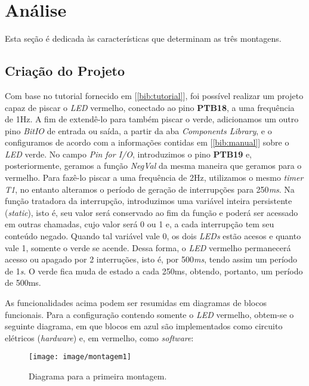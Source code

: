 \section {Análise}

Esta seção é dedicada às características que determinam as três montagens.

\subsection{Criação do Projeto}

Com base no tutorial fornecido em [\ref{bib:tutorial}], foi possível
realizar um projeto capaz de piscar o \textit{LED} vermelho, conectado ao pino
\textbf{PTB18}, a uma frequência de 1Hz. A fim de extendê-lo para também piscar
o verde, adicionamos um outro pino \textit {BitIO} de entrada ou saída, a partir
da aba \textit{Components Library}, e o configuramos de acordo com a informações
contidas em [\ref{bib:manual}] sobre o \textit{LED} verde. No campo \textit{Pin
for I/O}, introduzimos o pino \textbf{PTB19} e, posteriormente, geramos a função
\textit{NegVal} da mesma maneira que geramos para o vermelho. Para fazê-lo
piscar a uma frequência de 2Hz, utilizamos o mesmo \textit{timer} \textit{T1},
no entanto alteramos o período de geração de interrupções para 250\textit{ms}.
Na função tratadora da interrupção, introduzimos uma variável inteira
persistente (\textit{static}), isto é, seu valor será conservado ao fim da
função e poderá ser acessado em outras chamadas, cujo valor será 0 ou 1 e, a
cada interrupção tem seu conteúdo negado. Quando tal variável vale 0, os dois
\textit{LEDs} estão acesos e quanto vale 1, somente o verde se acende. Dessa
forma, o \textit{LED} vermelho permanecerá acesso ou apagado por 2 interruções,
isto é, por 500\textit{ms}, tendo assim um período de 1\textit{s}. O verde fica
muda de estado a cada 250ms, obtendo, portanto, um período de 500ms.

\vspace{12pt}

As funcionalidades acima podem ser resumidas em diagramas de blocos funcionais.
Para a configuração contendo somente o \textit{LED} vermelho, obtem-se o
seguinte diagrama, em que blocos em azul são implementados como circuito
elétricos (\textit{hardware}) e, em vermelho, como \textit{software}: 

\FloatBarrier

\begin{figure}[h]
    \centering
    \texttt{[image: image/montagem1]}
    
    \caption{Diagrama para a primeira montagem.}
    \label{fig:m1}
\end{figure} 

